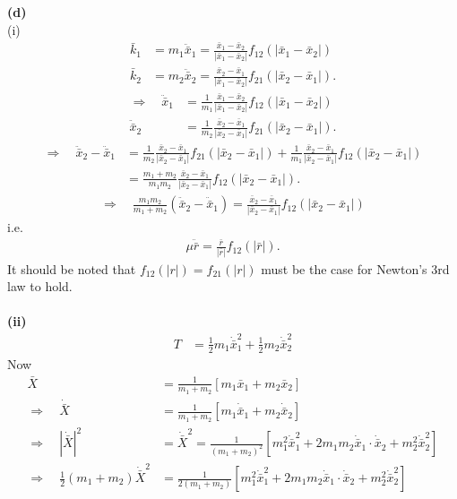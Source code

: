 \documentclass[12pt]{article}
\begin{document}
\newpage
\noindent
\textbf{(d)}\\
(i)
\begin{align*}
\bar{k}_1 &= m_1\ddot{\bar{x}}_1
= \frac{\bar{x}_1-\bar{x}_2}{|\bar{x}_1-\bar{x}_2|}
f_{12}(|\bar{x}_1-\bar{x}_2|) \\
\bar{k}_2 &= m_2\ddot{\bar{x}}_2
= \frac{\bar{x}_2-\bar{x}_1}{|\bar{x}_1-\bar{x}_2|}
f_{21}(|\bar{x}_2-\bar{x}_1|).
\end{align*}
\begin{align*}
\Rightarrow\quad
\ddot{\bar{x}}_1
&= \frac{1}{m_1}
\frac{\bar{x}_1-\bar{x}_2}{|\bar{x}_1-\bar{x}_2|}
f_{12}(|\bar{x}_1-\bar{x}_2|) \\
\ddot{\bar{x}}_2
&= \frac{1}{m_2}
\frac{\bar{x}_2-\bar{x}_1}{|\bar{x}_2-\bar{x}_1|}
f_{21}(|\bar{x}_2-\bar{x}_1|).
\end{align*}
\begin{align*}
\Rightarrow\quad
\ddot{\bar{x}}_2-\ddot{\bar{x}}_1
&=
\frac{1}{m_2}
\frac{\bar{x}_2-\bar{x}_1}{|\bar{x}_2-\bar{x}_1|}
f_{21}(|\bar{x}_2-\bar{x}_1|)
+
\frac{1}{m_1}
\frac{\bar{x}_2-\bar{x}_1}{|\bar{x}_2-\bar{x}_1|}
f_{12}(|\bar{x}_2-\bar{x}_1|) \\
&=
\frac{m_1+m_2}{m_1m_2}
\frac{\bar{x}_2-\bar{x}_1}{|\bar{x}_2-\bar{x}_1|}
f_{12}(|\bar{x}_2-\bar{x}_1|).
\end{align*}
\begin{align*}
\Rightarrow\quad
\frac{m_1m_2}{m_1+m_2}
(\ddot{\bar{x}}_2-\ddot{\bar{x}}_1)
=
\frac{\bar{x}_2-\bar{x}_1}{|\bar{x}_2-\bar{x}_1|}
f_{12}(|\bar{x}_2-\bar{x}_1|)
\end{align*}
i.e.
\begin{align*}
\mu\ddot{\bar{r}}
=
\frac{\bar{r}}{|\bar{r}|}f_{12}(|\bar{r}|).
\end{align*}
It should be noted that $f_{12}(|r|) = f_{21}(|r|)$ must be the case for Newton's 3rd law to hold.\\
\\
\textbf{(ii)}
\begin{align*}
T &= \frac{1}{2}m_1\dot{\bar{x}}_1^2 + \frac{1}{2}m_2\dot{\bar{x}}_2^2
\end{align*}
Now
\begin{align*}
\bar{X}
&=\frac{1}{m_1+m_2}\left[m_1\bar{x}_1+m_2\bar{x}_2\right] \\
\Rightarrow\quad
\dot{\bar{X}}
&=\frac{1}{m_1+m_2}\left[m_1\dot{\bar{x}}_1+m_2\dot{\bar{x}}_2\right] \\
\Rightarrow\quad
|\dot{\bar{X}}|^2
&=\dot{\bar{X}}^2
=\frac{1}{(m_1+m_2)^2}
\left[m_1^2\dot{\bar{x}}_1^2
+2m_1m_2\dot{\bar{x}}_1\cdot\dot{\bar{x}}_2
+m_2^2\dot{\bar{x}}_2^2\right] \\
\Rightarrow\quad
\frac{1}{2}(m_1+m_2)\dot{\bar{X}}^2
&=\frac{1}{2(m_1+m_2)}
\left[m_1^2\dot{\bar{x}}_1^2
+2m_1m_2\dot{\bar{x}}_1\cdot\dot{\bar{x}}_2
+m_2^2\dot{\bar{x}}_2^2\right]
\end{align*}
\end{document}
